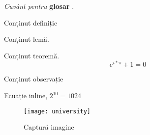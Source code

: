 \textit{Cuvânt pentru} \textbf{glosar} .	

\begin{definition}
	Conținut definiție
\end{definition}

\begin{lemma}
	Conținut lemă.
\end{lemma}

\begin{theorem}
	Conținut teoremă.
	\[
		e^{i * \pi} + 1 = 0
	\]
\end{theorem}

\begin{remark}
	Conținut observație
\end{remark}

Ecuație inline, $2^{10} = 1024 $

\begin{figure}[h]
	\begin{center}
			\texttt{[image: university]}
	\end{center}
	\caption{Captură imagine}
\end{figure}